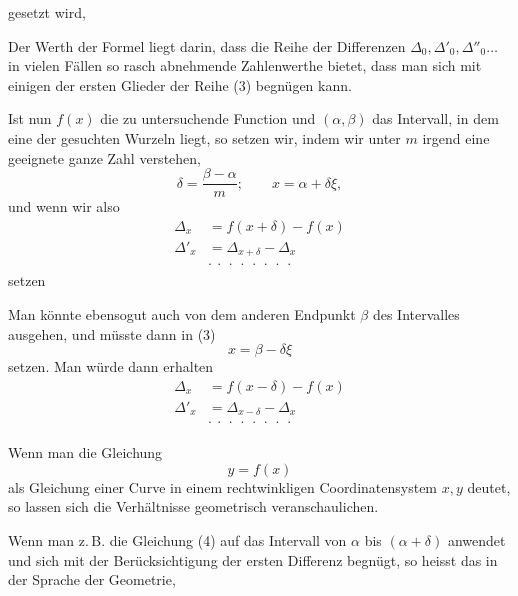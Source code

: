 

gesetzt wird,


Der Werth der Formel liegt darin, dass die Reihe der Differenzen $\Delta_0, \Delta'_0, \Delta''_0 \ldots$ in vielen Fällen so rasch abnehmende Zahlenwerthe bietet, dass man sich mit einigen der ersten Glieder der Reihe (3) begnügen kann.

Ist nun $f(x)$ die zu untersuchende Function und $(\alpha, \beta)$ das Intervall, in dem eine der gesuchten Wurzeln liegt, so setzen wir, indem wir unter $m$ irgend eine geeignete ganze Zahl verstehen,
\[
\delta = \frac{\beta - \alpha}{m}; \qquad x = \alpha + \delta \xi,
\]
und wenn wir also
\[
\begin{aligned}
\Delta_x &= f(x + \delta) - f(x) \\
\Delta'_x &= \Delta_{x+\delta} - \Delta_x \\
&\cdot\ \cdot\ \cdot\ \cdot\ \cdot\ \cdot\ \cdot\ \cdot
\end{aligned}
\]
setzen


Man könnte ebensogut auch von dem anderen Endpunkt $\beta$ des Intervalles ausgehen, und müsste dann in (3)
\[
x = \beta - \delta \xi
\]
setzen. Man würde dann erhalten
\[
\begin{aligned}
\Delta_x &= f(x - \delta) - f(x) \\
\Delta'_x &= \Delta_{x-\delta} - \Delta_x \\
&\cdot\ \cdot\ \cdot\ \cdot\ \cdot\ \cdot\ \cdot\ \cdot
\end{aligned}
\]


Wenn man die Gleichung
\[
y = f(x)
\]
als Gleichung einer Curve in einem rechtwinkligen Coordinatensystem $x, y$ deutet, so lassen sich die Verhältnisse geometrisch veranschaulichen.

Wenn man z.\,B. die Gleichung (4) auf das Intervall von $\alpha$ bis $(\alpha + \delta)$ anwendet und sich mit der Berücksichtigung der ersten Differenz begnügt, so heisst das in der Sprache der Geometrie,
